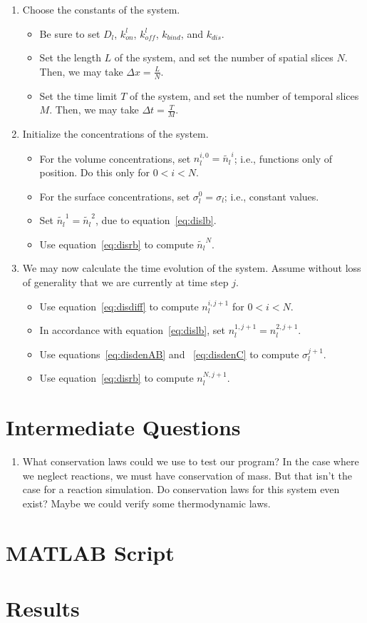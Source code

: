 \documentclass[aps, prl, preprint]{revtex4-1}
\begin{document}
\begin{enumerate}
\item Choose the constants of the system.
	\begin{itemize}
	\item Be sure to set $D_l$, $k_{on}^l$, $k_{off}^l$, $k_{bind}$, and $k_{dis}$.
	\item Set the length $L$ of the system, and set the number of spatial slices $N$. Then, we may take $\Delta x = \frac{L}{N}$.
	\item Set the time limit $T$ of the system, and set the number of temporal slices $M$. Then, we may take $\Delta t = \frac{T}{M}$.
	\end{itemize}
\item Initialize the concentrations of the system.
	\begin{itemize}
	\item For the volume concentrations, set $n_l^{i,0}=\widetilde{n_l}^i$; i.e., functions only of position. Do this only for $0 < i < N$.
	\item For the surface concentrations, set $\sigma_l^0 = \sigma_l$; i.e., constant values.
	\item Set $\widetilde{n_l}^1 = \widetilde{n_l}^2$, due to equation~\ref{eq:dislb}.
	\item Use equation~\ref{eq:disrb} to compute $\widetilde{n_l}^N$.
	\end{itemize}
\item We may now calculate the time evolution of the system. Assume without loss of generality that we are currently at time step $j$.
	\begin{itemize}
	\item Use equation~\ref{eq:disdiff} to compute $n_l^{i,j+1}$ for $0 < i < N$.
	\item In accordance with equation~\ref{eq:dislb}, set $n_l^{1,j+1}=n_l^{2,j+1}$.
	\item Use equations~\ref{eq:disdenAB} and ~\ref{eq:disdenC} to compute $\sigma_l^{j+1}$.
	\item Use equation~\ref{eq:disrb} to compute $n_l^{N,j+1}$.
	\end{itemize}
\end{enumerate}

\section{Intermediate Questions}

\begin{enumerate}
\item What conservation laws could we use to test our program? In the case where we neglect reactions, we must have conservation of mass. But that isn't the case for a reaction simulation. Do conservation laws for this system even exist? Maybe we could verify some thermodynamic laws.
\end{enumerate}

\section{MATLAB Script}

\section{Results}
\end{document}
